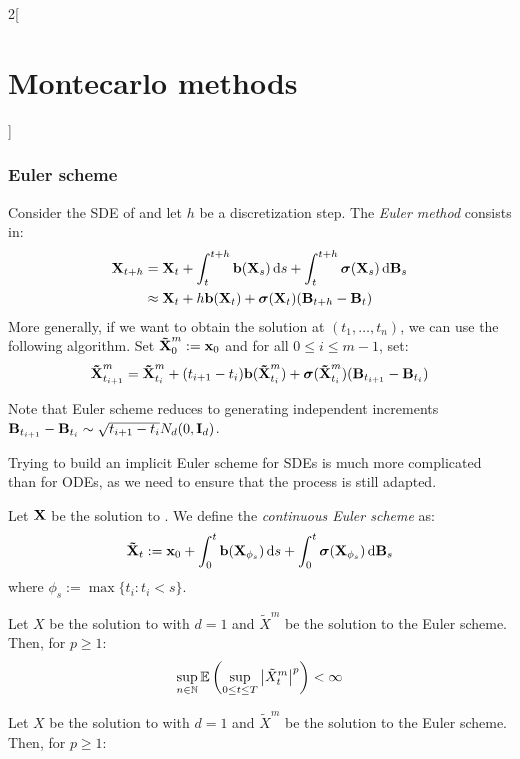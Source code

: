 \documentclass[../../../main_math.tex]{subfiles}
\begin{document}
\begin{multicols}{2}[\section{Montecarlo methods}]
  \subsubsection{Euler scheme}
  \begin{definition}
    Consider the SDE of  and let $h$ be a discretization step. The \emph{Euler method} consists in:
    \begin{align*}
      \boldsymbol{\mathrm{X}}_{t+h} & =\boldsymbol{\mathrm{X}}_t+\int_t^{t+h}\boldsymbol{\mathrm{b}}(\boldsymbol{\mathrm{X}}_s)\dd{s}+\int_t^{t+h}\boldsymbol{\mathrm{\sigma}}(\boldsymbol{\mathrm{X}}_s)\dd{\boldsymbol{\mathrm{B}}_s} \\
                   & \approx \boldsymbol{\mathrm{X}}_t+h\boldsymbol{\mathrm{b}}(\boldsymbol{\mathrm{X}}_t)+\boldsymbol{\mathrm{\sigma}}(\boldsymbol{\mathrm{X}}_t)(\boldsymbol{\mathrm{B}}_{t+h}-\boldsymbol{\mathrm{B}}_t)
    \end{align*}
    More generally, if we want to obtain the solution at $(t_1,\dots,t_n)$, we can use the following algorithm. Set $\boldsymbol{\mathrm{\tilde{X}}}^m_0:=\boldsymbol{\mathrm{x}}_0$ and for all $0\leq i\leq m-1$, set:
    $$
      \boldsymbol{\mathrm{\tilde{X}}}^m_{t_{i+1}}=\boldsymbol{\mathrm{\tilde{X}}}^m_{t_i}+(t_{i+1}-t_i)\boldsymbol{\mathrm{b}}(\boldsymbol{\mathrm{\tilde{X}}}^m_{t_i})+\boldsymbol{\mathrm{\sigma}}(\boldsymbol{\mathrm{\tilde{X}}}^m_{t_i})(\boldsymbol{\mathrm{B}}_{t_{i+1}}-\boldsymbol{\mathrm{B}}_{t_i})
    $$
  \end{definition}
  \begin{remark}
    Note that Euler scheme reduces to generating independent increments $\boldsymbol{\mathrm{B}}_{t_{i+1}}-\boldsymbol{\mathrm{B}}_{t_i}\sim \sqrt{t_{i+1}-t_i}N_d(0,\boldsymbol{\mathrm{I}}_d)$.
  \end{remark}
  \begin{remark}
    Trying to build an implicit Euler scheme for SDEs is much more complicated than for  ODEs, as we need to ensure that the process is still adapted.
  \end{remark}
  \begin{definition}
    Let $\boldsymbol{\mathrm{X}}$ be the solution to . We define the \emph{continuous Euler scheme} as:
    $$
      \boldsymbol{\mathrm{\tilde{X}}}_t:=\boldsymbol{\mathrm{x}}_0+\int_0^t\boldsymbol{\mathrm{b}}(\boldsymbol{\mathrm{X}}_{\phi_s})\dd{s}+\int_0^t\boldsymbol{\mathrm{\sigma}}(\boldsymbol{\mathrm{X}}_{\phi_s})\dd{\boldsymbol{\mathrm{B}}_s}
    $$
    where $\phi_s:=\max\{ t_i: t_i< s\}$.
  \end{definition}
  \begin{lemma}
    Let $X$ be the solution to  with $d=1$ and $\tilde{X}^m$ be the solution to the Euler scheme. Then, for $p\geq 1$:
    $$
      \sup_{n\in\mathbb{N}}\mathbb{E}\left( \sup_{0\leq t\leq T}\abs{\tilde{X}^m_t}^p\right)<\infty
    $$
  \end{lemma}
  \begin{lemma}
    Let $X$ be the solution to  with $d=1$ and $\tilde{X}^m$ be the solution to the Euler scheme. Then, for $p\geq 1$:

\end{lemma}
\end{multicols}
\end{document}
